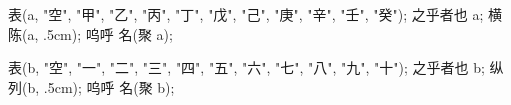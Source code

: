 \usemodule[zhfonts]

表(a, "空", "甲", "乙", "丙", "丁",
      "戊", "己", "庚", "辛", "壬", "癸");
之乎者也 a;
横陈(a, .5cm); 呜呼 名(聚 a);

表(b, "空", "一", "二", "三", "四", 
      "五", "六", "七", "八", "九", "十");
之乎者也 b;
纵列(b, .5cm); 呜呼 名(聚 b);
\stopuseMPgraphic

\startTEXpage[offset=4pt]
\stopTEXpage
